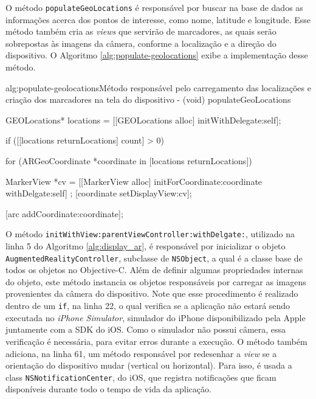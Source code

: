 O método \texttt{populateGeoLocations} é responsável por buscar na base de dados as informações
acerca dos pontos de interesse, como nome, latitude e longitude. Esse método também cria as 
\textit{views} que servirão de marcadores, as quais serão sobrepostas às imagens da câmera, 
conforme a localização e a direção do dispositivo. O Algoritmo \ref{alg:populate-geolocations}
exibe a implementação desse método.



\begin{sourcecode}{alg:populate-geolocations}{Método responsável pelo carregamento das localizações e criação dos marcadores na tela do dispositivo}
- (void) populateGeoLocations
{
    GEOLocations* locations = [[GEOLocations alloc] initWithDelegate:self];

    if ([[locations returnLocations] count] > 0)
    {
        for (ARGeoCoordinate *coordinate in [locations returnLocations])
        {

            MarkerView *cv = [[MarkerView alloc] initForCoordinate:coordinate withDelgate:self] ;
            [coordinate setDisplayView:cv];

            [arc addCoordinate:coordinate];
        }
    }
}
\end{sourcecode}



O método \texttt{initWithView:parentViewController:withDelgate:}, utilizado na linha 5 do
Algoritmo \ref{alg:display_ar}, é responsável por inicializar o objeto 
\texttt{AugmentedRealityController}, subclasse de \texttt{NSObject}, a qual é a classe base
de todos os objetos no Objective-C. Além de definir algumas propriedades internas do objeto, 
este método instancia os objetos responsáveis por carregar as imagens provenientes da câmera
do dispositivo. Note que esse procedimento é realizado dentro de um \texttt{if}, na linha 22, o qual verifica
se a aplicação não estará sendo executada no \textit{iPhone Simulator}, simulador do iPhone disponibilizado
pela Apple juntamente com a \gls{SDK} do iOS. Como o simulador não possui câmera, essa verificação é
necessária, para evitar erros durante a execução. O método também adiciona, na linha 61, um método responsável por
redesenhar a \textit{view} se a orientação do dispositivo mudar (vertical ou horizontal). Para isso, é usada
a class \texttt{NSNotificationCenter}, do iOS, que registra notificações que ficam disponíveis durante todo o 
tempo de vida da aplicação.


